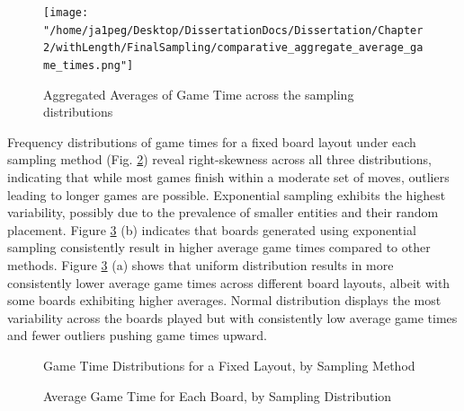\documentclass[12pt]{report}
\begin{document}
	\begin{figure}[ht]
		\centering
		 \texttt{[image: "/home/ja1peg/Desktop/DissertationDocs/Dissertation/Chapter 2/withLength/FinalSampling/comparative\_aggregate\_average\_game\_times.png"]} 
		\caption{Aggregated Averages of Game Time across the sampling distributions}
		\label{fig:sampling_dist_avg_times}
	\end{figure}
	
	Frequency distributions of game times for a fixed board layout under each sampling method (Fig. \ref{fig:sampling_dist_layout_dists}) reveal right-skewness across all three distributions, indicating that while most games finish within a moderate set of moves, outliers leading to longer games are possible. Exponential sampling exhibits the highest variability, possibly due to the prevalence of smaller entities and their random placement. Figure \ref{fig:sampling_dist_board_avg_times} (b) indicates that boards generated using exponential sampling consistently result in higher average game times compared to other methods. Figure \ref{fig:sampling_dist_board_avg_times} (a) shows that uniform distribution results in more consistently lower average game times across different board layouts, albeit with some boards exhibiting higher averages. Normal distribution displays the most variability across the boards played but with consistently low average game times and fewer outliers pushing game times upward.
	
	\begin{figure}[ht]
		\centering
		\caption{Game Time Distributions for a Fixed Layout, by Sampling Method}
		\label{fig:sampling_dist_layout_dists}
	\end{figure}
	
	\begin{figure}[ht]
		\centering
		\linebreak
		\caption{Average Game Time for Each Board, by Sampling Distribution}
		\label{fig:sampling_dist_board_avg_times}
	\end{figure}
	
\end{document}
